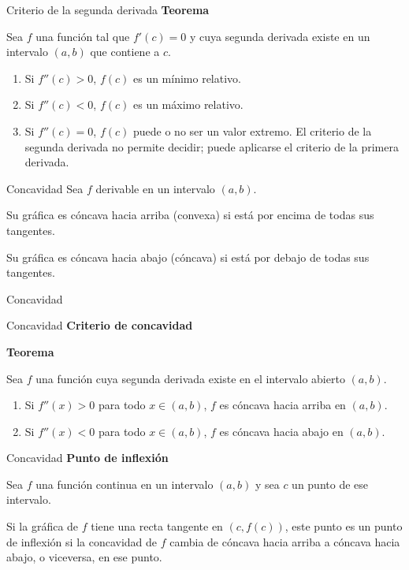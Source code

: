\documentclass[main.tex]{subfiles}
\begin{document}
\begin{frame}{Criterio de la segunda derivada}
\small\textbf{Teorema}\par Sea $f$ una función tal que $f'(c)=0$ y cuya segunda derivada existe en un intervalo $(a,b)$ que contiene a $c$.
\begin{enumerate}
\item Si $f''(c)>0$, $f(c)$ es un mínimo relativo.
\item Si $f''(c)<0$, $f(c)$ es un máximo relativo.
\item Si $f''(c)=0$, $f(c)$ puede o no ser un valor extremo. El criterio de la segunda derivada no permite decidir; puede aplicarse el criterio de la primera derivada.
\end{enumerate}
\end{frame}
\begin{frame}{Concavidad}
Sea $f$ derivable en un intervalo $(a,b)$.
\medskip

Su gráfica es cóncava hacia arriba (convexa) si está por encima de todas sus tangentes.
\medskip

Su gráfica es cóncava hacia abajo (cóncava) si está por debajo de todas sus tangentes.
\end{frame}
\begin{frame}{Concavidad}
\end{frame}
\begin{frame}{Concavidad}
\textbf{Criterio de concavidad}\par\medskip
\textbf{Teorema}\par Sea $f$ una función cuya segunda derivada existe en el intervalo abierto $(a,b)$.
\begin{enumerate}
\item Si $f''(x)>0$ para todo $x\in(a,b)$, $f$ es cóncava hacia arriba en $(a,b)$.
\item Si $f''(x)<0$ para todo $x\in(a,b)$, $f$ es cóncava hacia abajo en $(a,b)$.
\end{enumerate}
\end{frame}
\begin{frame}{Concavidad}
\textbf{Punto de inflexión}\par\medskip
Sea $f$ una función continua en un intervalo $(a,b)$ y sea $c$ un punto de ese intervalo.
\medskip

Si la gráfica de $f$ tiene una recta tangente en $(c,f(c))$, este punto es un punto de inflexión si la concavidad de $f$ cambia de cóncava hacia arriba a cóncava hacia abajo, o viceversa, en ese punto.
\end{frame}
\end{document}
